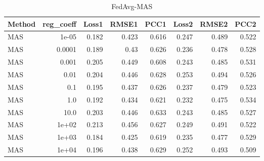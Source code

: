 \begin{table}
\caption{FedAvg-MAS}
\begin{tabular}{lrrrrrrr}
\toprule
Method & reg_coeff & Loss1 & RMSE1 & PCC1 & Loss2 & RMSE2 & PCC2 \\
\midrule
MAS & 1e-05 & 0.182 & 0.423 & 0.616 & 0.247 & 0.489 & 0.522 \\
MAS & 0.0001 & 0.189 & 0.43 & 0.626 & 0.236 & 0.478 & 0.528 \\
MAS & 0.001 & 0.205 & 0.449 & 0.608 & 0.243 & 0.485 & 0.531 \\
MAS & 0.01 & 0.204 & 0.446 & 0.628 & 0.253 & 0.494 & 0.526 \\
MAS & 0.1 & 0.195 & 0.437 & 0.626 & 0.237 & 0.479 & 0.523 \\
MAS & 1.0 & 0.192 & 0.434 & 0.621 & 0.232 & 0.475 & 0.534 \\
MAS & 10.0 & 0.203 & 0.446 & 0.633 & 0.243 & 0.485 & 0.527 \\
MAS & 1e+02 & 0.213 & 0.456 & 0.627 & 0.249 & 0.491 & 0.522 \\
MAS & 1e+03 & 0.184 & 0.425 & 0.619 & 0.235 & 0.477 & 0.529 \\
MAS & 1e+04 & 0.196 & 0.438 & 0.629 & 0.252 & 0.493 & 0.509 \\
\bottomrule
\end{tabular}
\end{table}
